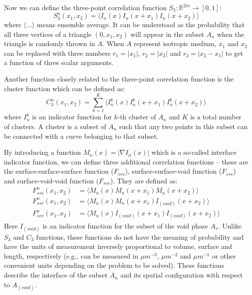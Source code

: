 \documentclass[reprint,amsmath,amssymb,aps,pre,showkeys,showpacs]{revtex4-1}
\begin{document}
Now we can define the three-point correlation function
$S_3: \mathbb{R}^{2m} \rightarrow [0, 1]$:
\begin{equation}
  S_3^n(x_1, x_2) = \langle I_n(x) I_n(x + x_1) I_n(x + x_2) \rangle
\end{equation}
where $\langle \dots \rangle$ means ensemble average. It can be understood as
the probability that all three vertices of a triangle $(0, x_1, x_2)$ will
appear in the subset $A_n$ when the triangle is randomly thrown in $A$. When $A$
represent isotropic medium, $x_1$ and $x_2$ can be replaced with three numbers
$r_1 = |x_1|$, $r_2 = |x_2|$ and $r_3 = |x_2 - x_1|$ to get a function of three
scalar arguments.

Another function closely related to the three-point correlation function is the
cluster function which can be defined as:
\begin{equation}
  C_3^n(x_1, x_2) = \sum_{k=1}^K \langle I_n^k(x) I_n^k(x + x_1) I_n^k(x + x_2) \rangle
\end{equation}
where $I_n^k$ is an indicator function for $k$-th cluster of $A_n$ and $K$
is a total number of clusters. A cluster is a subset of $A_n$ such that any two
points in this subset can be connected with a curve belonging to that subset.

By introducing a function $M_n(x) = |\nabla I_n(x)|$ which is a so-called interface
indicator function, we can define three additional
correlation functions -- these are the surface-surface-surface function
($F_{sss}$), surface-surface-void function ($F_{ssv}$) and surface-void-void
function ($F_{svv}$). They are defined as:
\begin{align}
  F_{sss}^n(x_1, x_2) &= \langle M_n(x) M_n(x + x_1) M_n(x + x_2) \rangle \\
  F_{ssv}^n(x_1, x_2) &= \langle M_n(x) M_n(x + x_1) I_{(void)}(x + x_2) \rangle \\
  F_{svv}^n(x_1, x_2) &= \langle M_n(x) I_{(void)}(x + x_1) I_{(void)}(x + x_2) \rangle
\end{align}
Here $I_{(void)}$ is an indicator function for the subset of the void phase
$A_v$. Unlike $S_3$ and $C_3$ functions, these functions do not have the meaning
of probability and have the units of measurement inversely proportional to
volume, surface and length, respectively (e.g., can be measured in $\mu m^{-3}$,
$\mu m^{-2}$ and $\mu m^{-1}$ or other convenient units depending on the problem
to be solved).  These functions describe the interface of the subset $A_n$ and
its spatial configuration with respect to $A_{(void)}$.
\end{document}
